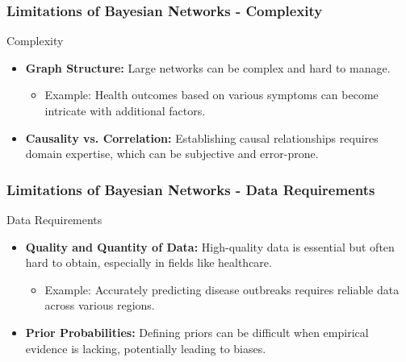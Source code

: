 \documentclass[aspectratio=169]{beamer}
\begin{document}
\begin{frame}[fragile]
  \frametitle{Limitations of Bayesian Networks - Complexity}
  
  \begin{block}{Complexity}
    \begin{itemize}
      \item \textbf{Graph Structure:} Large networks can be complex and hard to manage.
        \begin{itemize}
          \item Example: Health outcomes based on various symptoms can become intricate with additional factors.
        \end{itemize}
      \item \textbf{Causality vs. Correlation:} Establishing causal relationships requires domain expertise, which can be subjective and error-prone.
    \end{itemize}
  \end{block}
\end{frame}

\begin{frame}[fragile]
  \frametitle{Limitations of Bayesian Networks - Data Requirements}
  
  \begin{block}{Data Requirements}
    \begin{itemize}
      \item \textbf{Quality and Quantity of Data:} High-quality data is essential but often hard to obtain, especially in fields like healthcare.
        \begin{itemize}
          \item Example: Accurately predicting disease outbreaks requires reliable data across various regions.
        \end{itemize}
      \item \textbf{Prior Probabilities:} Defining priors can be difficult when empirical evidence is lacking, potentially leading to biases.
    \end{itemize}
  \end{block}
\end{frame}
\end{document}
